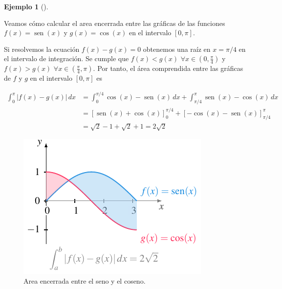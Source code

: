 \documentclass[
  a4paper,
]{scrreport}
\theoremstyle{plain}
\theoremstyle{plain}
\theoremstyle{definition}
\theoremstyle{plain}
\theoremstyle{definition}
\newtheorem{example}{Ejemplo}[chapter]
\theoremstyle{remark}
\begin{document}
\leavevmode{}%
\begin{example}[]\label{exm-area-funcion-positiva-negativa}

Veamos cómo calcular el area encerrada entre las gráficas de las
funciones \(f(x)=\operatorname{sen}(x)\) y \(g(x)=\cos(x)\) en el
intervalo \([0,\pi]\).

Si resolvemos la ecuación \(f(x)-g(x)=0\) obtenemos una raíz en
\(x=\pi/4\) en el intervalo de integración. Se cumple que \(f(x)<g(x)\)
\(\forall x\in\left(0,\frac{\pi}{4}\right)\) y \(f(x)>g(x)\)
\(\forall x\in\left(\frac{\pi}{4},\pi\right)\). Por tanto, el área
comprendida entre las gráficas de \(f\) y \(g\) en el intervalo
\([0,\pi]\) es

\begin{align*}
\int_0^\pi |f(x)-g(x)|\,dx 
&= \int_0^{\pi/4} \cos(x)-\operatorname{sen}(x)\,dx +\int_{\pi/4}^{\pi} \operatorname{sen}(x)-\cos(x)\,dx\\
&= \left[\operatorname{sen}(x)+\cos(x)\right]_0^{\pi/4} + \left[-\cos(x)-\operatorname{sen}(x)\right]_{\pi/4}^{\pi} \\
&= \sqrt{2}-1 +\sqrt{2}+1 = 2\sqrt{2}
\end{align*}

\begin{figure}

{\centering \includegraphics{./img/integrales/area-entre-seno-coseno.pdf}

}

\caption{Area encerrada entre el seno y el coseno.}

\end{figure}

\end{example}
\end{document}
